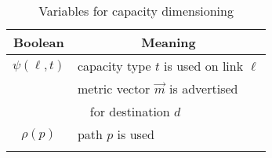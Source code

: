 \documentclass[journal]{IEEEtran}
\begin{document}
\begin{table}[t]\begin{center}\footnotesize
\begin{tabular}{ c l }
\toprule
\textbf{Boolean} & \multicolumn{1}{c}{\textbf{Meaning}} \\
\midrule
$\psi(\ell,t)$ & capacity type $t$ is used on link $\ell$ \\\addlinespace[1.0mm]
\multirow{2}{*}{$\varphi (\vec{m}, d)$} & metric vector $\vec{m}$ is advertised \\
 & $\text{ }$ for destination $d$ \\\addlinespace[1.0mm]
$\rho(p)$ & path $p$ is used \\\addlinespace[1.0mm]
\bottomrule
\end{tabular}\normalsize
\caption{Variables for capacity dimensioning}\label{NE_vars}
\end{center}\end{table}
\end{document}
